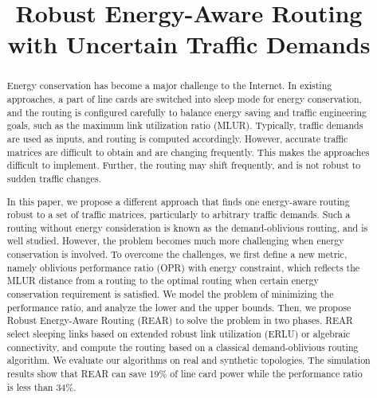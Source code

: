 \documentclass[conference]{IEEEtran}
\begin{document}
\title{Robust Energy-Aware Routing with Uncertain Traffic Demands}


\author{
\and
{}
\and
{}
}


\maketitle

\begin{abstract}
Energy conservation has become a major challenge to the Internet. In existing approaches, a part of line cards
are switched into sleep mode for energy conservation, and the routing is configured carefully to balance energy saving
and traffic engineering goals, such as the maximum link utilization ratio (MLUR). Typically, traffic demands are
used as inputs, and routing is computed accordingly. However, accurate traffic matrices are difficult to obtain and
are changing frequently. This makes the approaches difficult to implement. Further, the routing may shift
frequently, and is not robust to sudden traffic changes.

In this paper, we propose a different approach that finds one energy-aware routing robust to a set of traffic
matrices, particularly to arbitrary traffic demands. Such a routing without energy consideration is known as
the demand-oblivious routing, and is well studied. However, the problem becomes much more challenging when energy
conservation is involved. To overcome the challenges, we first define a new metric, namely oblivious performance
ratio (OPR) with energy constraint, which reflects the MLUR distance from a routing to the optimal routing when
certain energy conservation requirement is satisfied. We model the problem of minimizing the performance ratio,
and analyze the lower and the upper bounds. Then, we propose Robust Energy-Aware Routing (REAR) to solve
the problem in two phases. REAR select sleeping links based on extended robust link utilization (ERLU) or algebraic
connectivity, and compute the routing based on a classical demand-oblivious routing algorithm.
We evaluate our algorithms on real and synthetic topologies. The simulation results show that REAR can save
19\% of line card power while the performance ratio is less than 34\%.
\end{abstract}
\end{document}
